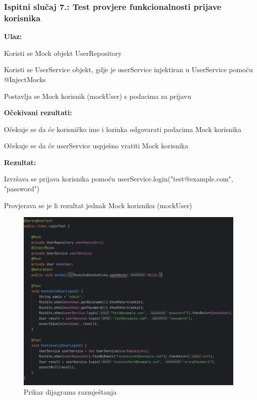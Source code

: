         


            \subsubsection{Ispitni slučaj 7.: Test provjere funkcionalnosti prijave korisnika}
            
             \noindent\textbf{Ulaz:}
            \begin{packed_item}
            	\item Koristi se Mock objekt UserRepository
            	\item Koristi se UserService objekt, gdje je userService injektiran u UserService pomoću @InjectMocks
            	\item Postavlja se Mock korisnik (mockUser) s podacima za prijavu
            \end{packed_item}
            
            \noindent\textbf{Očekivani rezultati:}
            \begin{packed_item}
            	\item Očekuje se da će korisničko ime i lozinka odgovarati podacima Mock korisnika
            	\item Očekuje se da će userService uspješno vratiti Mock korisnika
            	
            \end{packed_item}
            \noindent\textbf{Rezultat:}
            \begin{packed_item}
            	\item  Izvršava se prijava korisnika pomoću userService.login("test@example.com", "password")
            	\item  Provjerava se je li rezultat jednak Mock korisniku (mockUser)
            \end{packed_item}
				\begin{figure} [H]
					\centering
					\includegraphics[width=0.7\linewidth]{slike/LoginTest.png}
					\caption{Prikaz dijagrama razmještanja}
					\label{fig:Prikaz dijagrama razmještanja}
				\end{figure}
                                                                                           
